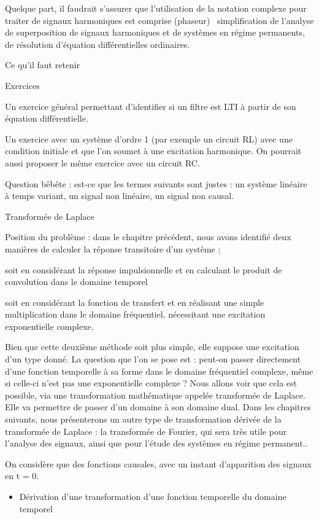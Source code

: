 \documentclass[]{article}
\begin{document}
Quelque part, il faudrait s'assurer que l'utilisation de la notation
complexe pour traiter de signaux harmoniques est comprise (phaseur)~
simplification de l'analyse de superposition de signaux harmoniques et
de systèmes en régime permanents, de résolution d'équation
différentielles ordinaires.

Ce qu'il faut retenir

Exercices

Un exercice général permettant d'identifier si un filtre est LTI à
partir de son équation différentielle.

Un exercice avec un système d'ordre 1 (par exemple un circuit RL) avec
une condition initiale et que l'on soumet à une excitation harmonique.
On pourrait aussi proposer le même exercice avec un circuit RC.

Question bêbête : est-ce que les termes suivants sont justes : un
système linéaire à temps variant, un signal non linéaire, un signal non
causal.

Transformée de Laplace

Position du problème : dans le chapitre précédent, nous avons identifié
deux manières de calculer la réponse transitoire d'un système :

soit en considérant la réponse impulsionnelle et en calculant le produit
de convolution dans le domaine temporel

soit en considérant la fonction de transfert et en réalisant une simple
multiplication dans le domaine fréquentiel, nécessitant une excitation
exponentielle complexe.

Bien que cette deuxième méthode soit plus simple, elle suppose une
excitation d'un type donné. La question que l'on se pose est : peut-on
passer directement d'une fonction temporelle à sa forme dans le domaine
fréquentiel complexe, même si celle-ci n'est pas une exponentielle
complexe ? Nous allons voir que cela est possible, via une
transformation mathématique appelée transformée de Laplace. Elle va
permettre de passer d'un domaine à son domaine dual. Dans les chapitres
suivants, nous présenterons un autre type de transformation dérivée de
la transformée de Laplace : la transformée de Fourier, qui sera très
utile pour l'analyse des signaux, ainsi que pour l'étude des systèmes en
régime permanent..

On considère que des fonctions causales, avec un instant d'apparition
des signaux en t = 0.

\begin{itemize}
\itemsep1pt\parskip0pt
\item
  Dérivation d'une transformation d'une fonction temporelle du domaine
  temporel
\end{itemize}
\end{document}
